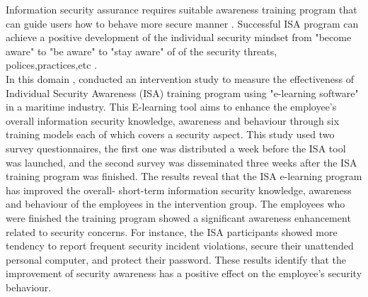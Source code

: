 Information security assurance requires suitable awareness training program that can guide users how to behave more secure manner \cite{safa2015information}. Successful ISA program can achieve a positive development of the individual security mindset from "become aware" to "be aware" to "stay aware" of of the security threats, polices,practices,etc \cite{Shaw2009,Schlienger2002}. \\
In this domain , \citet{merete2009effects} conducted an intervention study to measure the effectiveness of Individual Security  Awareness (ISA) training program using "e-learning software" in a maritime industry. This E-learning tool aims to enhance the employee's overall information security knowledge, awareness and behaviour through six training models each of which covers a security aspect. This study used two survey questionnaires, the first one was distributed a week before the ISA tool was launched, and the second survey was disseminated three weeks after the ISA training program was finished. The results reveal that the ISA e-learning program has improved the overall- short-term information security knowledge, awareness and behaviour of the employees in the intervention group. The employees who were finished the training program showed a significant awareness enhancement related to security concerns. For instance, the ISA participants showed more tendency to report frequent security incident violations, secure their unattended personal computer, and protect their password. These results identify that the improvement of security awareness has a positive effect on the employee's security behaviour.

